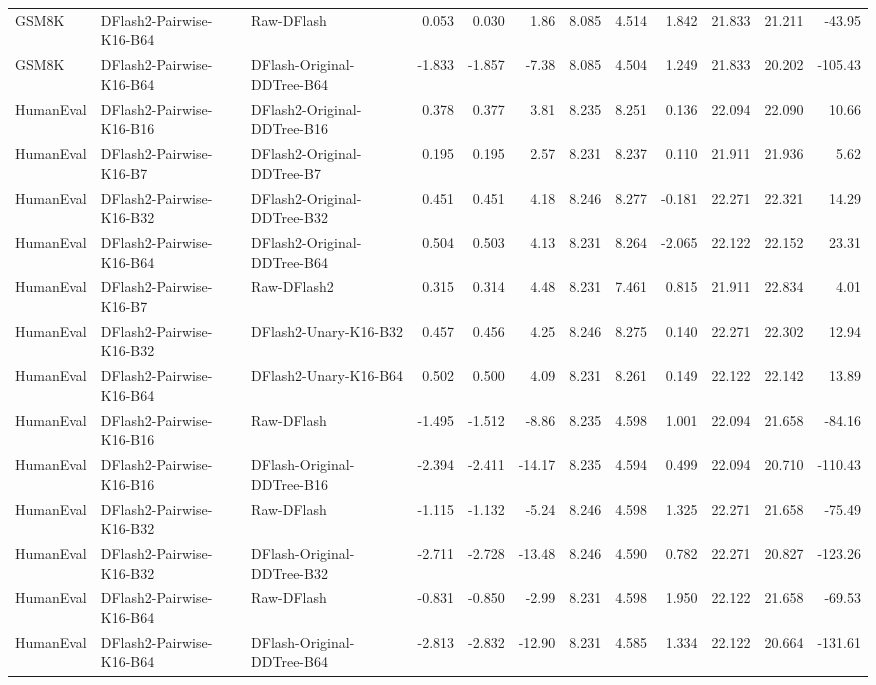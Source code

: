 \begin{longtable}{lllrrrrrrrrr}
GSM8K & DFlash2-Pairwise-K16-B64 & Raw-DFlash & 0.053 & 0.030 & 1.86 & 8.085 & 4.514 & 1.842 & 21.833 & 21.211 & -43.95 \\
GSM8K & DFlash2-Pairwise-K16-B64 & DFlash-Original-DDTree-B64 & -1.833 & -1.857 & -7.38 & 8.085 & 4.504 & 1.249 & 21.833 & 20.202 & -105.43 \\
HumanEval & DFlash2-Pairwise-K16-B16 & DFlash2-Original-DDTree-B16 & 0.378 & 0.377 & 3.81 & 8.235 & 8.251 & 0.136 & 22.094 & 22.090 & 10.66 \\
HumanEval & DFlash2-Pairwise-K16-B7 & DFlash2-Original-DDTree-B7 & 0.195 & 0.195 & 2.57 & 8.231 & 8.237 & 0.110 & 21.911 & 21.936 & 5.62 \\
HumanEval & DFlash2-Pairwise-K16-B32 & DFlash2-Original-DDTree-B32 & 0.451 & 0.451 & 4.18 & 8.246 & 8.277 & -0.181 & 22.271 & 22.321 & 14.29 \\
HumanEval & DFlash2-Pairwise-K16-B64 & DFlash2-Original-DDTree-B64 & 0.504 & 0.503 & 4.13 & 8.231 & 8.264 & -2.065 & 22.122 & 22.152 & 23.31 \\
HumanEval & DFlash2-Pairwise-K16-B7 & Raw-DFlash2 & 0.315 & 0.314 & 4.48 & 8.231 & 7.461 & 0.815 & 21.911 & 22.834 & 4.01 \\
HumanEval & DFlash2-Pairwise-K16-B32 & DFlash2-Unary-K16-B32 & 0.457 & 0.456 & 4.25 & 8.246 & 8.275 & 0.140 & 22.271 & 22.302 & 12.94 \\
HumanEval & DFlash2-Pairwise-K16-B64 & DFlash2-Unary-K16-B64 & 0.502 & 0.500 & 4.09 & 8.231 & 8.261 & 0.149 & 22.122 & 22.142 & 13.89 \\
HumanEval & DFlash2-Pairwise-K16-B16 & Raw-DFlash & -1.495 & -1.512 & -8.86 & 8.235 & 4.598 & 1.001 & 22.094 & 21.658 & -84.16 \\
HumanEval & DFlash2-Pairwise-K16-B16 & DFlash-Original-DDTree-B16 & -2.394 & -2.411 & -14.17 & 8.235 & 4.594 & 0.499 & 22.094 & 20.710 & -110.43 \\
HumanEval & DFlash2-Pairwise-K16-B32 & Raw-DFlash & -1.115 & -1.132 & -5.24 & 8.246 & 4.598 & 1.325 & 22.271 & 21.658 & -75.49 \\
HumanEval & DFlash2-Pairwise-K16-B32 & DFlash-Original-DDTree-B32 & -2.711 & -2.728 & -13.48 & 8.246 & 4.590 & 0.782 & 22.271 & 20.827 & -123.26 \\
HumanEval & DFlash2-Pairwise-K16-B64 & Raw-DFlash & -0.831 & -0.850 & -2.99 & 8.231 & 4.598 & 1.950 & 22.122 & 21.658 & -69.53 \\
HumanEval & DFlash2-Pairwise-K16-B64 & DFlash-Original-DDTree-B64 & -2.813 & -2.832 & -12.90 & 8.231 & 4.585 & 1.334 & 22.122 & 20.664 & -131.61 \\

\end{longtable}

